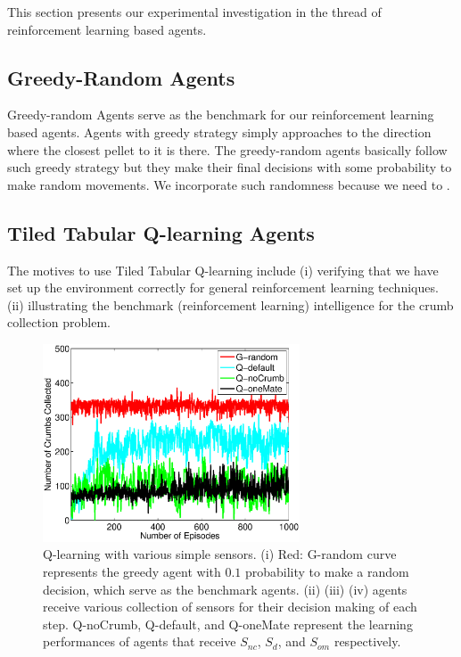 \documentclass[conference]{IEEEtran}
\begin{document}
This section presents our experimental investigation in the thread of reinforcement
learning based agents.

\subsection{Greedy-Random Agents} 
Greedy-random Agents serve as the benchmark for our reinforcement
learning based agents.
Agents with greedy strategy simply approaches to the direction where the
closest pellet to it is there.
The greedy-random agents basically follow such greedy strategy but they make
their final decisions with some probability to make random movements. 
We incorporate such randomness because we need to .

\subsection{Tiled Tabular Q-learning Agents}
The motives to use Tiled Tabular Q-learning include
(i) verifying that we have set up the environment correctly for general
reinforcement learning techniques. 
(ii) illustrating the benchmark (reinforcement learning) intelligence for the
crumb collection problem.

\begin{figure}[!t]
\centering
\includegraphics[width=3.0in]{./figures/RL/init_setup1.eps}
\caption{Q-learning with various simple sensors. (i) Red: G-random curve
    represents the greedy agent with $0.1$ probability to make a random
    decision, which serve as the benchmark agents. 
    (ii) (iii) (iv) agents receive various collection of sensors for their
    decision making of each step. Q-noCrumb, Q-default, and Q-oneMate
    represent the learning performances of agents that receive $S_{nc}$,
    $S_{d}$, and $S_{om}$ respectively.
} 
\label{fig:RL_init}
\end{figure}
\end{document}
